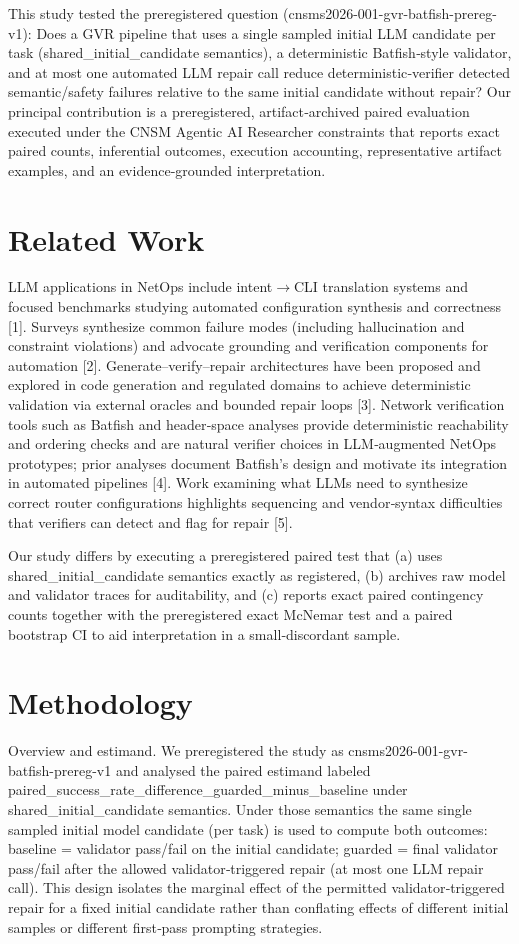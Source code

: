 \documentclass[conference]{IEEEtran}
\begin{document}
This study tested the preregistered question (cnsms2026-001-gvr-batfish-prereg-v1): Does a GVR pipeline that uses a single sampled initial LLM candidate per task (shared\_initial\_candidate semantics), a deterministic Batfish‑style validator, and at most one automated LLM repair call reduce deterministic‑verifier detected semantic/safety failures relative to the same initial candidate without repair? Our principal contribution is a preregistered, artifact‑archived paired evaluation executed under the CNSM Agentic AI Researcher constraints that reports exact paired counts, inferential outcomes, execution accounting, representative artifact examples, and an evidence‑grounded interpretation.

\section{Related Work}
LLM applications in NetOps include intent\ensuremath{\rightarrow}CLI translation systems and focused benchmarks studying automated configuration synthesis and correctness [1]. Surveys synthesize common failure modes (including hallucination and constraint violations) and advocate grounding and verification components for automation [2]. Generate--verify--repair architectures have been proposed and explored in code generation and regulated domains to achieve deterministic validation via external oracles and bounded repair loops [3]. Network verification tools such as Batfish and header‑space analyses provide deterministic reachability and ordering checks and are natural verifier choices in LLM‑augmented NetOps prototypes; prior analyses document Batfish's design and motivate its integration in automated pipelines [4]. Work examining what LLMs need to synthesize correct router configurations highlights sequencing and vendor‑syntax difficulties that verifiers can detect and flag for repair [5].

Our study differs by executing a preregistered paired test that (a) uses shared\_initial\_candidate semantics exactly as registered, (b) archives raw model and validator traces for auditability, and (c) reports exact paired contingency counts together with the preregistered exact McNemar test and a paired bootstrap CI to aid interpretation in a small‑discordant sample.

\section{Methodology}
Overview and estimand.  We preregistered the study as cnsms2026-001-gvr-batfish-prereg-v1 and analysed the paired estimand labeled paired\_success\_rate\_difference\_guarded\_minus\_baseline under shared\_initial\_candidate semantics. Under those semantics the same single sampled initial model candidate (per task) is used to compute both outcomes: baseline = validator pass/fail on the initial candidate; guarded = final validator pass/fail after the allowed validator‑triggered repair (at most one LLM repair call). This design isolates the marginal effect of the permitted validator‑triggered repair for a fixed initial candidate rather than conflating effects of different initial samples or different first‑pass prompting strategies.
\end{document}
